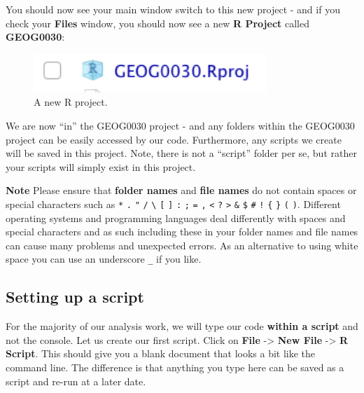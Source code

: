 \documentclass[
]{book}
\begin{document}
You should now see your main window switch to this new project - and if you check your \textbf{Files} window, you should now see a new \textbf{R Project} called \textbf{GEOG0030}:

\begin{figure}

{\centering \includegraphics[width=250pt]{images/w04/r-project} 

}

\caption{A new R project.}\label{fig:04-R-project}
\end{figure}

We are now ``in'' the GEOG0030 project - and any folders within the GEOG0030 project can be easily accessed by our code. Furthermore, any scripts we create will be saved in this project. Note, there is not a ``script'' folder per se, but rather your scripts will simply exist in this project.

\textbf{Note}
Please ensure that \textbf{folder names} and \textbf{file names} do not contain spaces or special characters such as \texttt{*} \texttt{.} \texttt{"} \texttt{/} \texttt{\textbackslash{}} \texttt{{[}} \texttt{{]}} \texttt{:} \texttt{;} \texttt{\textbar{}} \texttt{=} \texttt{,} \texttt{\textless{}} \texttt{?} \texttt{\textgreater{}} \texttt{\&} \texttt{\$} \texttt{\#} \texttt{!} \texttt{\textquotesingle{}} \texttt{\{} \texttt{\}} \texttt{(} \texttt{)}. Different operating systems and programming languages deal differently with spaces and special characters and as such including these in your folder names and file names can cause many problems and unexpected errors. As an alternative to using white space you can use an underscore \texttt{\_} if you like.

\hypertarget{setting-up-a-script}{%
\subsection{Setting up a script}\label{setting-up-a-script}}

For the majority of our analysis work, we will type our code \textbf{within a script} and not the console. Let us create our first script. Click on \textbf{File} -\textgreater{} \textbf{New File} -\textgreater{} \textbf{R Script}. This should give you a blank document that looks a bit like the command line. The difference is that anything you type here can be saved as a script and re-run at a later date.
\end{document}
